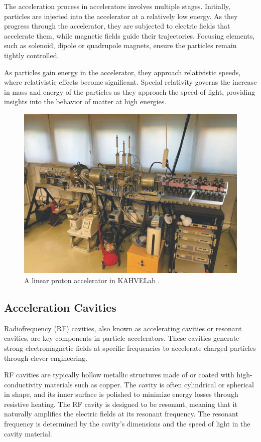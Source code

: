 \documentclass{article}
\begin{document}
The acceleration process in accelerators involves multiple stages. Initially, particles are injected into the accelerator at a relatively low energy. 
As they progress through the accelerator, they are subjected to electric fields that accelerate them, while magnetic fields guide their trajectories.
Focusing elements, such as solenoid, dipole or quadrupole magnets, ensure the particles remain tightly controlled.

As particles gain energy in the accelerator, they approach relativistic speeds, where relativistic effects become significant. 
Special relativity governs the increase in mass and energy of the particles as they approach the speed of light, providing insights into the behavior of matter at high energies.
\begin{figure}[H]
    \centering
    \includegraphics[width=.9\textwidth]{../../../figures/kahvelab_linac.png}
    \vspace{20pt}
    \caption{A linear proton accelerator in KAHVELab \cite{kahvelab_linac}.}
\end{figure}

\subsection{Acceleration Cavities} \label{sec:theory_cavities}
Radiofrequency (RF) cavities, also known as accelerating cavities or resonant cavities, are key components in particle accelerators. 
These cavities generate strong electromagnetic fields at specific frequencies to accelerate charged particles through clever engineering.

RF cavities are typically hollow metallic structures made of or coated with high-conductivity materials such as copper. 
The cavity is often cylindrical or spherical in shape, and its inner surface is polished to minimize energy losses through resistive heating.
The RF cavity is designed to be resonant, meaning that it naturally amplifies the electric fields at its resonant frequency. 
The resonant frequency is determined by the cavity's dimensions and the speed of light in the cavity material.
\end{document}
